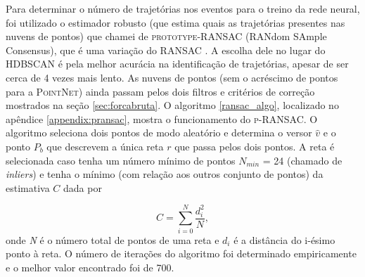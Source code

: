 \documentclass[a4paper,12pt,oneside]{book}
\begin{document}
\par Para determinar o número de trajetórias nos eventos para o treino da rede neural, foi utilizado o estimador robusto (que estima quais as trajetórias presentes nas nuvens de pontos) que chamei de \textsc{prototype-RANSAC} (RANdom SAmple Consensus), que é uma variação do \textsc{RANSAC} \cite{ransac, artigo}. A escolha dele no lugar do \textsc{HDBSCAN} é pela melhor acurácia na identificação de trajetórias, apesar de ser cerca de 4 vezes mais lento. As nuvens de pontos (sem o acréscimo de pontos para a \textsc{PointNet}) ainda passam pelos dois filtros e critérios de correção mostrados na seção \ref{sec:forcabruta}. O algoritmo \ref{ransac_algo}, localizado no apêndice \ref{appendix:pransac}, mostra o funcionamento do \textsc{p-RANSAC}. O algoritmo seleciona dois pontos de modo aleatório e determina o versor $\hat{v}$ e o ponto $P_b$ que descrevem a única reta $r$ que passa pelos dois pontos. A reta é selecionada caso tenha um número mínimo de pontos $N_{min}$ = 24 (chamado de \textit{inliers}) e tenha o mínimo (com relação aos outros conjunto de pontos) da estimativa $C$ dada por \cite{artigo}

\begin{equation} \label{criterio_ransac}
    C = \sum_{i = 0}^{N} \frac{d_i ^2}{N},
\end{equation}
%
onde \textit{N} é o número total de pontos de uma reta e $d_i$ é a distância do i-ésimo ponto à reta. O número de iterações do algoritmo foi determinado empiricamente e o melhor valor encontrado foi de 700.

\end{document}
